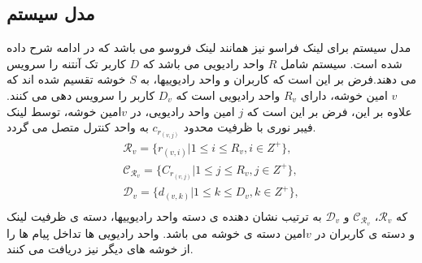 \subsection{مدل سیستم}
مدل سیستم برای لینک فراسو نیز همانند لینک فروسو می باشد که در ادامه شرح داده شده است\cite{ofdma,ulCompression}.
 سیستم  شامل $R$ واحد رادیویی می باشد که $D$ کاربر تک آنتنه را سرویس می دهند.فرض بر این است که کاربران و واحد رادیوییها، به 
 $S$
خوشه تقسیم شده اند که $v$ امین خوشه،
 دارای $R_v$ واحد رادیویی است که ${D}_v$ کاربر را سرویس دهی می کنند.
 علاوه بر این، فرض بر این است که
$j$
امین واحد رادیویی، در $v$امین خوشه، توسط لینک فیبر نوری با ظرفیت محدود $c_{r_{(v,j)}}$ به واحد کنترل متصل می گردد.
\begin{equation}
\begin{split}
\mathcal{R}_v= \{  r_{(v,i)} | 1 \leq i \leq {R}_v , i\in Z^+\}, \\
\mathcal{C}_{\mathcal{R}_v}= \{C_{r_{(v,j)}}| 1 \leq j \leq {R}_v , j\in Z^+\}, \\
\mathcal{D}_v= \{  d_{(v,k)} | 1 \leq k \leq {D}_v , k\in Z^+\},  \\
\end{split}
\end{equation} 
که
 $\mathcal{R}_v$، $\mathcal{C}_{\mathcal{R}_v}$
 و
  $\mathcal{D}_v$
 به ترتیب نشان دهنده ی دسته واحد رادیوییها، دسته ی ظرفیت لینک  و دسته ی کاربران در $v$امین دسته ی خوشه می باشد.\newline
واحد رادیویی
ها تداخل پیام ها را از خوشه های دیگر نیز دریافت می کنند.\newline
